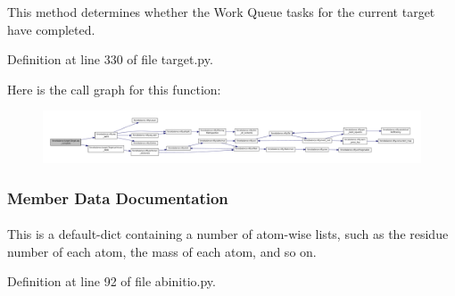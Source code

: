 \-This method determines whether the \-Work \-Queue tasks for the current target have completed. 



\-Definition at line 330 of file target.\-py.



\-Here is the call graph for this function\-:
\nopagebreak
\begin{figure}[H]
\begin{center}
\leavevmode
\includegraphics[width=350pt]{classforcebalance_1_1target_1_1Target_af6099ec09486213869dba2491bd8ea04_cgraph}
\end{center}
\end{figure}




\subsubsection{\-Member \-Data \-Documentation}
\hypertarget{classforcebalance_1_1abinitio_1_1AbInitio_a3eceb701813ccb83d11a0dc71df835b7}{
\paragraph[{\-Atom\-Lists}]{}}\label{classforcebalance_1_1abinitio_1_1AbInitio_a3eceb701813ccb83d11a0dc71df835b7}


\-This is a default-\/dict containing a number of atom-\/wise lists, such as the residue number of each atom, the mass of each atom, and so on. 



\-Definition at line 92 of file abinitio.\-py.

\hypertarget{classforcebalance_1_1abinitio_1_1AbInitio_a003717f2442aac7d1067e74b89a14cc7}{
\paragraph[{e\-\_\-err}]{}}\label{classforcebalance_1_1abinitio_1_1AbInitio_a003717f2442aac7d1067e74b89a14cc7}


